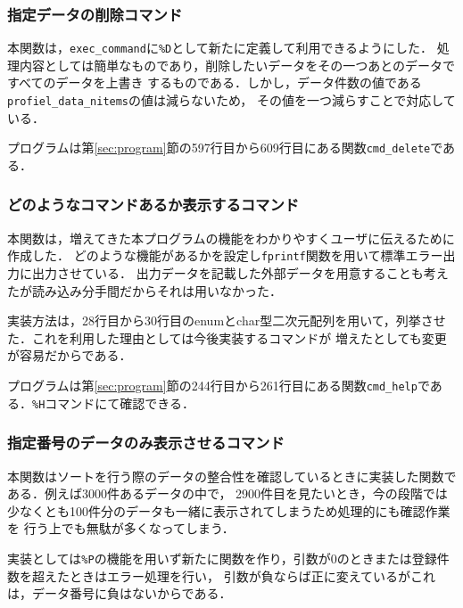 \documentclass[a4j,11pt]{jarticle}
\begin{document}
\subsubsection{指定データの削除コマンド}\label{sec:sakujyo}
本関数は，\verb|exec_command|に\verb|%D|として新たに定義して利用できるようにした．
処理内容としては簡単なものであり，削除したいデータをその一つあとのデータですべてのデータを上書き
するものである．しかし，データ件数の値である\verb|profiel_data_nitems|の値は減らないため，
その値を一つ減らすことで対応している．

プログラムは第\ref{sec:program}節の597行目から609行目にある関数\verb|cmd_delete|である．
\subsubsection{どのようなコマンドあるか表示するコマンド}\label{sec:help}
本関数は，増えてきた本プログラムの機能をわかりやすくユーザに伝えるために作成した．
どのような機能があるかを設定し\verb|fprintf|関数を用いて標準エラー出力に出力させている．
出力データを記載した外部データを用意することも考えたが読み込み分手間だからそれは用いなかった．

実装方法は，28行目から30行目のenumとchar型二次元配列を用いて，列挙させた．これを利用した理由としては今後実装するコマンドが
増えたとしても変更が容易だからである．

プログラムは第\ref{sec:program}節の244行目から261行目にある関数\verb|cmd_help|である．\verb|%H|コマンドにて確認できる．
\subsubsection{指定番号のデータのみ表示させるコマンド}\label{sec:printyouso}
本関数はソートを行う際のデータの整合性を確認しているときに実装した関数である．例えば3000件あるデータの中で，
2900件目を見たいとき，今の段階では少なくとも100件分のデータも一緒に表示されてしまうため処理的にも確認作業を
行う上でも無駄が多くなってしまう．

実装としては\verb|%P|の機能を用いず新たに関数を作り，引数が0のときまたは登録件数を超えたときはエラー処理を行い，
引数が負ならば正に変えているがこれは，データ番号に負はないからである．
\end{document}
